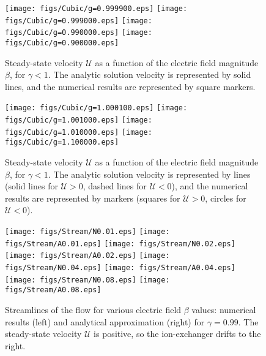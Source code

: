 \documentclass[final]{elsarticle}
\newcommand\cU{\mathscr{U}}
\begin{document}
\begin{figure}[htbp]
    \begin{center}
    \texttt{[image: figs/Cubic/g=0.999900.eps]}
    \texttt{[image: figs/Cubic/g=0.999000.eps]}
    \texttt{[image: figs/Cubic/g=0.990000.eps]}
    \texttt{[image: figs/Cubic/g=0.900000.eps]}
        \caption{Steady-state velocity $\cU$ as a function of the 
        electric field magnitude $\beta$, for $\gamma < 1$. 
        The analytic solution velocity is represented by solid lines, 
        and the numerical results are represented by square markers.}
	    \label{fig:Cubic1}
    \end{center}
\end{figure}
\begin{figure}[htbp]
    \begin{center}
    \texttt{[image: figs/Cubic/g=1.000100.eps]}
    \texttt{[image: figs/Cubic/g=1.001000.eps]}
    \texttt{[image: figs/Cubic/g=1.010000.eps]}
    \texttt{[image: figs/Cubic/g=1.100000.eps]}
        \caption{Steady-state velocity $\cU$ as a function of the 
        electric field magnitude $\beta$, for $\gamma < 1$. 
        The analytic solution velocity is represented by lines 
        (solid lines for $\cU > 0$, dashed lines for $\cU < 0$), 
        and the numerical results are represented by markers 
        (squares for $\cU > 0$, circles for $\cU < 0$).}
	    \label{fig:Cubic2}
    \end{center}
\end{figure}
\begin{figure}[htbp]
    \begin{center}
	\texttt{[image: figs/Stream/N0.01.eps]}
	\texttt{[image: figs/Stream/A0.01.eps]}
	\texttt{[image: figs/Stream/N0.02.eps]}
	\texttt{[image: figs/Stream/A0.02.eps]}
	\texttt{[image: figs/Stream/N0.04.eps]}
	\texttt{[image: figs/Stream/A0.04.eps]}
	\texttt{[image: figs/Stream/N0.08.eps]}
	\texttt{[image: figs/Stream/A0.08.eps]}
        \caption{Streamlines of the flow for various electric field $\beta$ values: 
        numerical results (left) and analytical approximation (right) for 
        $\gamma = 0.99$.  The steady-state velocity $\cU$ is positive, so the
        ion-exchanger drifts to the right. 
        }
    \label{fig:Vortex}
    \end{center}
\end{figure}



\end{document}
